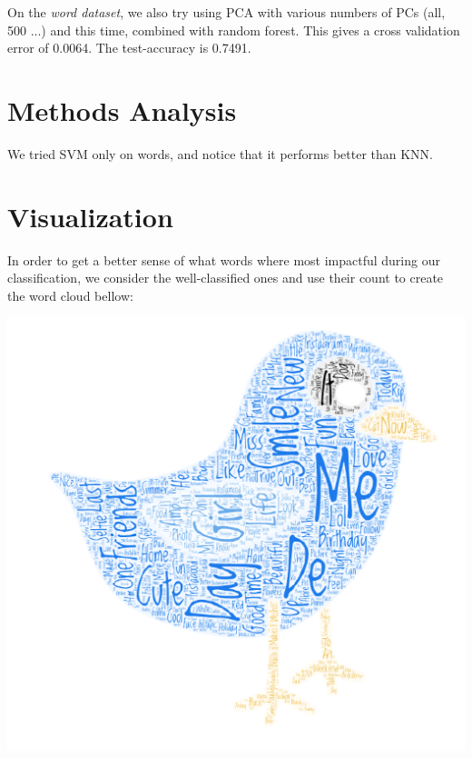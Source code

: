 \documentclass[11pt,twocolumn]{report}
\begin{document}
    
   On the \textit{word dataset}, we also try using PCA with various numbers of PCs (all, 500 ...) and this time, combined with random forest. This gives a cross validation error of 0.0064. The test-accuracy is 0.7491.\\
    
    

\section *{Methods Analysis}

    We tried SVM only on words, and notice that it performs better than KNN.

\section*{Visualization}
    In order to get a better sense of what words where most impactful during our classification, we consider the well-classified ones and use their count to create the word cloud bellow:
    
    \begin{center}
    \includegraphics[scale=0.45]{cloud}
    \end{center}



\end{document}
